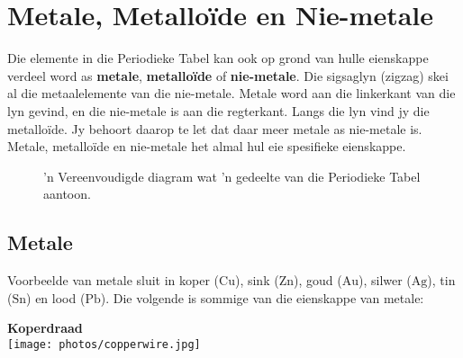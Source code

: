             \section{Metale, Metallo\"ide en Nie-metale}
            \nopagebreak
      \label{m38708*id65693}Die elemente in die Periodieke Tabel kan ook op grond van hulle eienskappe verdeel word as \textbf{metale}, \textbf{metallo\"ide} of \textbf{nie-metale}. Die sigsaglyn (zigzag) skei al die metaalelemente van die nie-metale. Metale word aan die linkerkant van die lyn gevind, en die nie-metale is aan die regterkant. Langs die lyn vind jy die metalloïde. Jy behoort daarop te let dat daar meer metale as nie-metale is. Metale, metallo\"ide en nie-metale het almal hul eie spesifieke eienskappe.\par 


\begin{figure}[h]

\begin{center}
\end{center}
\caption{'n Vereenvoudigde diagram wat  'n gedeelte van die Periodieke Tabel aantoon.}
\label{fig:periodic}
\end{figure} 
      \label{m38708*uid76}
            \subsection*{Metale}
            \nopagebreak
\begin{minipage}{.5\textwidth}
        \label{m38708*id65726}Voorbeelde van metale sluit in koper ($\text{Cu}$), sink ($\text{Zn}$), goud ($\text{Au}$), silwer ($\text{Ag}$), tin ($\text{Sn}$) en lood ($\text{Pb}$). Die volgende is sommige van die eienskappe van metale:\par 
\end{minipage}
\begin{minipage}{.5\textwidth}
\begin{center}
\textbf{Koperdraad}\\
 \texttt{[image: photos/copperwire.jpg]}
\end{center}
\end{minipage}

